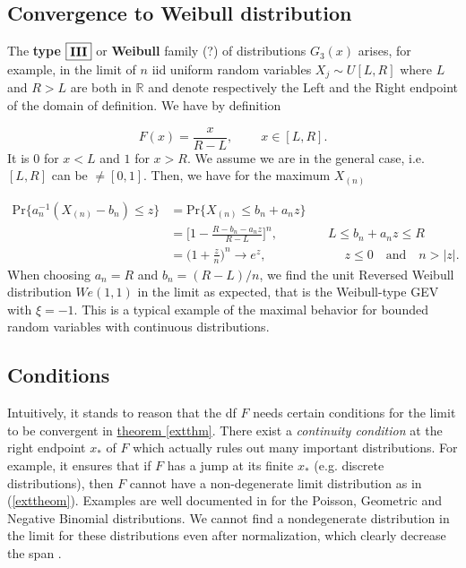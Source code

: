 \documentclass[11pt,a4paper,openany ]{book}
\begin{document}
\subsection*{Convergence to Weibull distribution}

The \textbf{type}  $\boxed{\textbf{\text{III}}}$ or \textbf{Weibull} family (?) of distributions $G_3(x)$ arises, for example, in the limit of $n$ iid uniform random variables $X_j\sim U[L,R]$ where $L$ and $R>L$ are both in $\mathbb{R}$  and denote respectively the Left and the Right endpoint of the domain of definition. We have by definition

\begin{equation*}
F(x)=\frac{x}{R-L}, \ \ \ \ \ \ \ \  \ \ x\in [L,R].
\end{equation*}
It is $0$ for $x<L$ and $1$ for $x>R$.
We assume we are in the general case, i.e. $[L,R]$ can be $\neq [0,1]$. Then, we have for the maximum $X_{(n)}$

\begin{equation*}
\begin{aligned}
\text{Pr}\{a_n^{-1}(X_{(n)}-b_n)\leq z\}
&=\text{Pr}\{X_{(n)}\leq b_n+a_nz\} \\
& = \bigg[1-\frac{R-b_n-a_nz}{R-L}\bigg]^n, \qquad\qquad L\leq b_n+a_nz\leq R \\ 
& = \Big(1+\frac{z}{n}\Big)^n\to e^z, \ \qquad \qquad\qquad  z\leq 0 \quad \text{and} \quad n>|z|.
\end{aligned}
\end{equation*}
When choosing $a_n=R$ and $b_n=(R-L)/n$, we find the unit Reversed Weibull distribution $We(1,1)$ in the limit as expected, that is the Weibull-type GEV with $\xi=-1$.
 This is a typical example of the maximal behavior for bounded random variables with
continuous distributions.


\subsection*{Conditions}

Intuitively, it stands to reason that the df $F$ needs certain conditions for the limit to be convergent in \hyperref[extthm]{theorem \ref{extthm}}. There exist a \emph{continuity condition} at the right endpoint $x_*$ of $F$ which actually rules out many important distributions. For example, it ensures that if $F$ has a jump at its finite $x_*$ (e.g. discrete distributions), then $F$ cannot have a non-degenerate limit distribution as in (\ref{exttheom}). Examples are well documented in \citet[section 3.1]{embrechts_modelling_2011} for the Poisson, Geometric and Negative Binomial distributions. We cannot find a nondegenerate distribution in the limit for these distributions even after normalization, which clearly decrease the span . 
\end{document}
